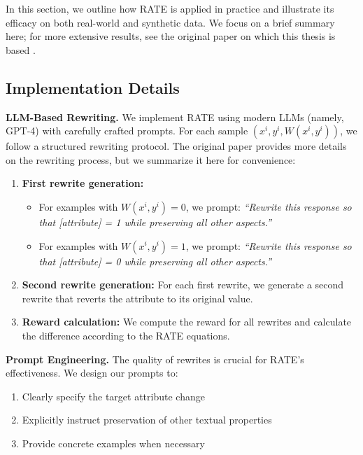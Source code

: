 In this section, we outline how RATE is applied in practice and illustrate its efficacy on both real-world and synthetic data. We focus on a brief summary here; for more extensive results, see the original paper on which this thesis is based \cite{reber2025ratecausalexplainabilityreward}.

\subsection{Implementation Details}

\textbf{LLM-Based Rewriting.} We implement RATE using modern LLMs (namely, GPT-4) with carefully crafted prompts. For each sample $(x^i, y^i, W(x^i, y^i))$, we follow a structured rewriting protocol. The original paper provides more details on the rewriting process, but we summarize it here for convenience:

\begin{enumerate}
    \item \textbf{First rewrite generation:}
    \begin{itemize}
        \item For examples with $W(x^i, y^i) = 0$, we prompt: \emph{``Rewrite this response so that [attribute] = 1 while preserving all other aspects.''}
        \item For examples with $W(x^i, y^i) = 1$, we prompt: \emph{``Rewrite this response so that [attribute] = 0 while preserving all other aspects.''}
    \end{itemize}

    \item \textbf{Second rewrite generation:} For each first rewrite, we generate a second rewrite that reverts the attribute to its original value.

    \item \textbf{Reward calculation:} We compute the reward for all rewrites and calculate the difference according to the RATE equations.
\end{enumerate}

\textbf{Prompt Engineering.} The quality of rewrites is crucial for RATE's effectiveness. We design our prompts to:

\begin{enumerate}
    \item Clearly specify the target attribute change
    \item Explicitly instruct preservation of other textual properties
    \item Provide concrete examples when necessary
\end{enumerate}

